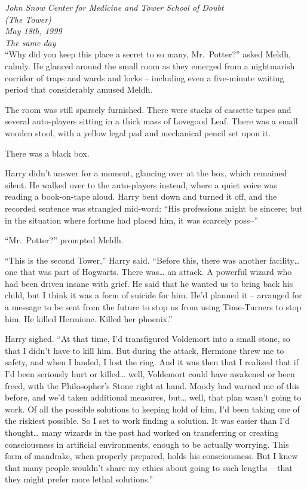 
\mybreak

\emph{John Snow Center for Medicine and Tower School of Doubt\\
(The Tower)}\\
\emph{May 18th, 1999}\\
\emph{The same day}\\

``Why did you keep this place a secret to so many, Mr.~Potter?'' asked
Meldh, calmly. He glanced around the small room as they emerged from a
nightmarish corridor of traps and wards and locks -- including even a
five-minute waiting period that considerably amused Meldh.

The room was still sparsely furnished. There were stacks of cassette
tapes and several auto-players sitting in a thick mass of Lovegood Leaf.
There was a small wooden stool, with a yellow legal pad and mechanical
pencil set upon it.

There was a black box.

Harry didn't answer for a moment, glancing over at the box, which
remained silent. He walked over to the auto-players instead, where a
quiet voice was reading a book-on-tape aloud. Harry bent down and turned
it off, and the recorded sentence was strangled mid-word: ``His
professions might be sincere; but in the situation where fortune had
placed him, it was scarcely poss--''

``Mr.~Potter?'' prompted Meldh.

``This is the second Tower,'' Harry said. ``Before this, there was
another facility\ldots{} one that was part of Hogwarts. There
was\ldots{} an attack. A powerful wizard who had been driven insane with
grief. He said that he wanted us to bring back his child, but I think it
was a form of suicide for him. He'd planned it -- arranged for a message
to be sent from the future to stop us from using Time-Turners to stop
him. He killed Hermione. Killed her phoenix.''

Harry sighed. ``At that time, I'd transfigured Voldemort into a small
stone, so that I didn't have to kill him. But during the attack,
Hermione threw me to safety, and when I landed, I lost the ring. And it
was then that I realized that if I'd been seriously hurt or
killed\ldots{} well, Voldemort could have awakened or been freed, with
the Philosopher's Stone right at hand. Moody had warned me of this
before, and we'd taken additional measures, but\ldots{} well, that plan
wasn't going to work. Of all the possible solutions to keeping hold of
him, I'd been taking one of the riskiest possible. So I set to work
finding a solution. It was easier than I'd thought\ldots{} many wizards
in the past had worked on transferring or creating consciousness in
artificial environments, enough to be actually worrying. This form of
mandrake, when properly prepared, holds his consciousness. But I knew
that many people wouldn't share my ethics about going to such lengths --
that they might prefer more lethal solutions.''

